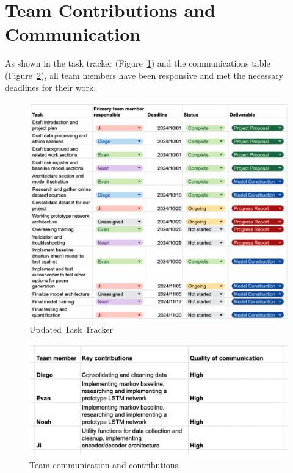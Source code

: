 \documentclass{article} %
\begin{document}
\section{Team Contributions and Communication}

As shown in the task tracker (Figure~\ref{fig:tasktracker}) and the communications table (Figure~\ref{fig:commstable}), all team members have been responsive and met the necessary deadlines for their work. 

\begin{figure}[h]
  \begin{center}
  \includegraphics[width=1\textwidth]{Figs/tasktracker.png}
  \end{center}
  \caption{Updated Task Tracker}
  \label{fig:tasktracker}
\end{figure}

\begin{figure}[h]
  \begin{center}
  \includegraphics[width=1\textwidth]{Figs/commstable.png}
  \end{center}
  \caption{Team communication and contributions}
  \label{fig:commstable}
\end{figure}
\end{document}
